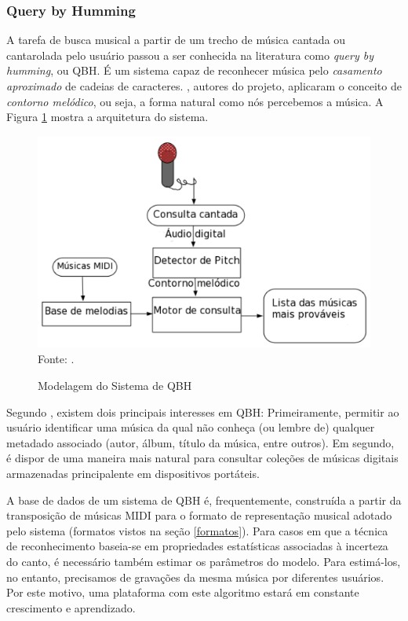 \subsubsection{Query by Humming}
A tarefa de busca musical a partir de um trecho de música cantada ou cantarolada pelo usuário passou a ser conhecida na literatura como \textit{query by humming}, ou QBH. É um sistema capaz de reconhecer música pelo \textit{casamento aproximado} de cadeias de caracteres. , autores do projeto, aplicaram o conceito de \textit{contorno melódico}, ou seja, a forma natural como nós percebemos a música. A Figura \ref{fig:qbh} mostra a arquitetura do sistema.

\begin{figure}[!htb]
   \centering
   \caption{Modelagem do Sistema de QBH}\label{fig:qbh} 
   \includegraphics[scale=0.50]{figuras/qbh.png}
   \\Fonte: \cite{santos2011}.
\end{figure}

Segundo , existem dois principais interesses em QBH: Primeiramente, permitir ao usuário identificar uma música da qual não conheça (ou lembre de) qualquer metadado associado (autor, álbum, título da música, entre outros). Em segundo, é dispor de uma maneira mais natural para consultar coleções de músicas digitais armazenadas principalente em dispositivos portáteis.

A base de dados de um sistema de QBH é, frequentemente, construída a partir da transposição de músicas MIDI para o formato de representação musical adotado pelo sistema (formatos vistos na seção \ref{formatos}). Para casos em que a técnica de reconhecimento baseia-se em propriedades estatísticas associadas à incerteza do canto, é necessário também estimar os parâmetros do modelo. Para estimá-los, no entanto, precisamos de gravações da mesma música por diferentes usuários. Por este motivo, uma plataforma com este algoritmo estará em constante crescimento e aprendizado.

